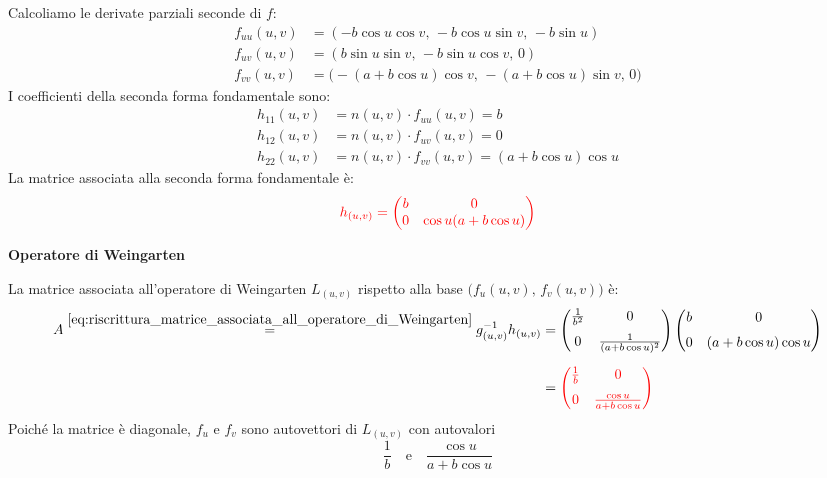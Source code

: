 \begin{esempio}
        Calcoliamo le derivate parziali seconde di $f$:
        \begin{align*}
        f_{uu}(u,v) &= (-b \cos u \cos v, \, -b \cos u \sin v, \, -b \sin u) \\
        f_{uv}(u,v) &= (b \sin u \sin v, \, -b \sin u \cos v, \, 0) \\ 
        f_{vv}(u,v) &= \big( -(a + b \cos u)\cos v, \, -(a + b \cos u)\sin v, \, 0 \big)
        \end{align*}
        I coefficienti della seconda forma fondamentale sono:
        \begin{align*}
        h_{11}(u,v) &= n(u,v) \cdot f_{uu}(u,v) = b \\
        h_{12}(u,v) &= n(u,v) \cdot f_{uv}(u,v) = 0 \\
        h_{22}(u,v) &= n(u,v) \cdot f_{vv}(u,v) = (a + b \cos u)\cos u
        \end{align*}
        La matrice associata alla seconda forma fondamentale è:
        \[
        \textcolor{red}{h_{(u,v)} = \begin{pmatrix}
        b & 0 \\
        0 & \cos u (a + b \cos u)
        \end{pmatrix}}
        \]

        \textbf{Operatore di Weingarten}

        La matrice associata all'operatore di Weingarten $L_{(u,v)}$ rispetto alla base $\big( f_u(u,v), \, f_v(u,v) \big)$ è:
        \begin{align*}
        A \overset{\eqref{eq:riscrittura_matrice_associata_all_operatore_di_Weingarten}}{=} g_{(u,v)}^{-1} h_{(u,v)} &= \begin{pmatrix}
        \frac{1}{b^2} & 0 \\[6pt]
        0 & \frac{1}{(a + b \cos u)^2}
        \end{pmatrix}
        \begin{pmatrix}
        b & 0 \\[6pt]
        0 & (a + b \cos u)\cos u
        \end{pmatrix} \\[6pt]
        &= \textcolor{red}{\begin{pmatrix}
        \frac{1}{b} & 0 \\[6pt]
        0 & \frac{\cos u}{a + b \cos u}
        \end{pmatrix}}
        \end{align*}
        Poiché la matrice è diagonale, $f_u$ e $f_v$ sono autovettori di $L_{(u,v)}$ con autovalori
        \[
        \frac{1}{b} \quad \text{e} \quad \frac{\cos u}{a + b \cos u}
        \]


\end{esempio}
